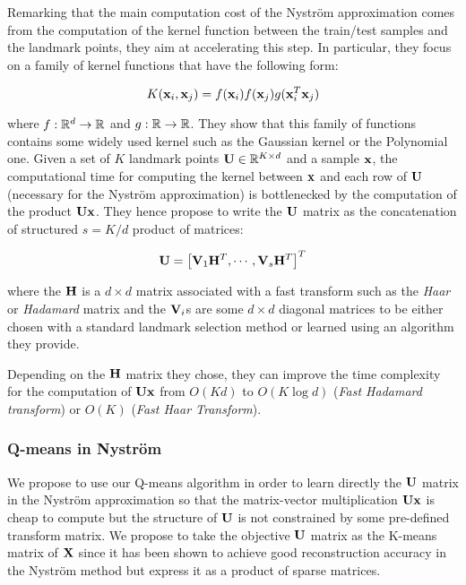 Remarking that the main computation cost of the Nyström approximation comes from the computation of the kernel function between the train/test samples and the landmark points, they aim at accelerating this step. In particular, they focus on a family of kernel functions that have the following form:

\begin{equation}
 K({\mathbf{x}}_i, {\mathbf{x}}_j) = f({\mathbf{x}}_i) f({\mathbf{x}}_j) g({\mathbf{x}}_i^T{\mathbf{x}}_j)
\end{equation}

where $f: \mathbb{R}^d \rightarrow \mathbb{R}$ and $g: \mathbb{R} \rightarrow \mathbb{R}$. They show that this family of functions contains some widely used kernel such as the Gaussian kernel or the Polynomial one. Given a set of $K$ landmark points ${\mathbf{U}} \in \mathbb{R}^{K \times d}$ and a sample ${\mathbf{x}}$, the computational time for computing the kernel between ${\mathbf{x}}$ and each row of ${\mathbf{U}}$ (necessary for the Nyström approximation) is bottlenecked by the computation of the product ${\mathbf{U}}{\mathbf{x}}$. They hence propose to write the ${\mathbf{U}}$ matrix as the concatenation of structured $s = K / d$ product of matrices:

\begin{equation}
 {\mathbf{U}} = \left[ {\mathbf{V}}_1 {\mathbf{H}}^T, \cdots, {\mathbf{V}}_s{\mathbf{H}}^T  \right]^T
\end{equation}

where the ${\mathbf{H}}$ is a $d \times d$ matrix associated with a fast transform such as the \textit{Haar} or \textit{Hadamard} matrix and the ${\mathbf{V}}_i$s are some $d \times d$ diagonal matrices to be either chosen with a standard landmark selection method or learned using an algorithm they provide.

Depending on the ${\mathbf{H}}$ matrix they chose, they can improve the time complexity for the computation of ${\mathbf{U}}{\mathbf{x}}$ from $O(Kd)$ to $O(K \log{d})$ (\textit{Fast Hadamard transform}) or $O(K)$ (\textit{Fast Haar Transform}).

\subsubsection{Q-means in Nyström}

We propose to use our Q-means algorithm in order to learn directly the ${\mathbf{U}}$ matrix in the Nyström approximation so that the matrix-vector multiplication ${\mathbf{U}} {\mathbf{x}}$ is cheap to compute but the structure of ${\mathbf{U}}$ is not constrained by some pre-defined transform matrix. We propose to take the objective ${\mathbf{U}}$ matrix as the K-means matrix of ${\mathbf{X}}$ since it has been shown to achieve good reconstruction accuracy in the Nyström method but express it as a product of sparse matrices.

